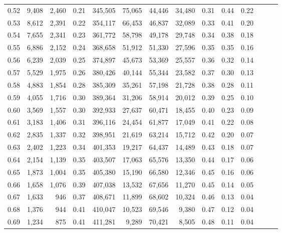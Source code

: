 \begin{tabular}{rrrrrrrrrrrrrr}
0.52 &   9,408 &  2,460 &  0.21 &  345,505 &   75,065 &  44,446 &  34,480 &  0.31 &  0.44 &      0.22 \\
0.53 &   8,612 &  2,391 &  0.22 &  354,117 &   66,453 &  46,837 &  32,089 &  0.33 &  0.41 &      0.20 \\
0.54 &   7,655 &  2,341 &  0.23 &  361,772 &   58,798 &  49,178 &  29,748 &  0.34 &  0.38 &      0.18 \\
0.55 &   6,886 &  2,152 &  0.24 &  368,658 &   51,912 &  51,330 &  27,596 &  0.35 &  0.35 &      0.16 \\
0.56 &   6,239 &  2,039 &  0.25 &  374,897 &   45,673 &  53,369 &  25,557 &  0.36 &  0.32 &      0.14 \\
0.57 &   5,529 &  1,975 &  0.26 &  380,426 &   40,144 &  55,344 &  23,582 &  0.37 &  0.30 &      0.13 \\
0.58 &   4,883 &  1,854 &  0.28 &  385,309 &   35,261 &  57,198 &  21,728 &  0.38 &  0.28 &      0.11 \\
0.59 &   4,055 &  1,716 &  0.30 &  389,364 &   31,206 &  58,914 &  20,012 &  0.39 &  0.25 &      0.10 \\
0.60 &   3,569 &  1,557 &  0.30 &  392,933 &   27,637 &  60,471 &  18,455 &  0.40 &  0.23 &      0.09 \\
0.61 &   3,183 &  1,406 &  0.31 &  396,116 &   24,454 &  61,877 &  17,049 &  0.41 &  0.22 &      0.08 \\
0.62 &   2,835 &  1,337 &  0.32 &  398,951 &   21,619 &  63,214 &  15,712 &  0.42 &  0.20 &      0.07 \\
0.63 &   2,402 &  1,223 &  0.34 &  401,353 &   19,217 &  64,437 &  14,489 &  0.43 &  0.18 &      0.07 \\
0.64 &   2,154 &  1,139 &  0.35 &  403,507 &   17,063 &  65,576 &  13,350 &  0.44 &  0.17 &      0.06 \\
0.65 &   1,873 &  1,004 &  0.35 &  405,380 &   15,190 &  66,580 &  12,346 &  0.45 &  0.16 &      0.06 \\
0.66 &   1,658 &  1,076 &  0.39 &  407,038 &   13,532 &  67,656 &  11,270 &  0.45 &  0.14 &      0.05 \\
0.67 &   1,633 &    946 &  0.37 &  408,671 &   11,899 &  68,602 &  10,324 &  0.46 &  0.13 &      0.04 \\
0.68 &   1,376 &    944 &  0.41 &  410,047 &   10,523 &  69,546 &   9,380 &  0.47 &  0.12 &      0.04 \\
0.69 &   1,234 &    875 &  0.41 &  411,281 &    9,289 &  70,421 &   8,505 &  0.48 &  0.11 &      0.04 \\

\end{tabular}
